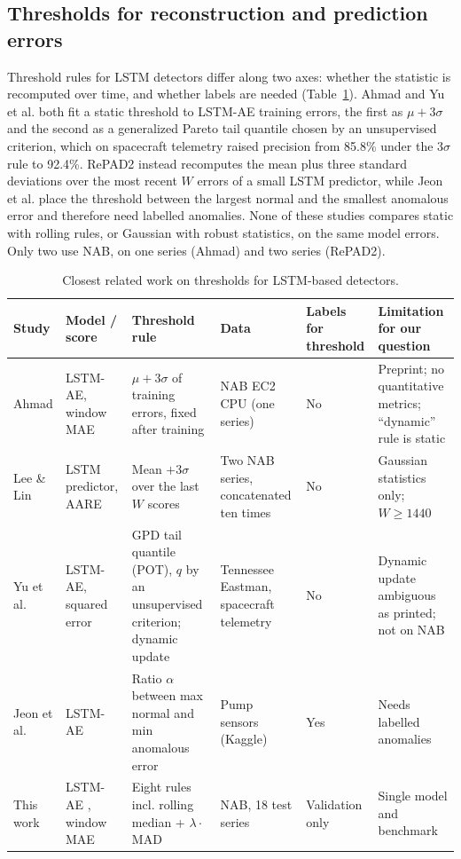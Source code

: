 \documentclass[conference]{IEEEtran}
\begin{document}
\subsection{Thresholds for reconstruction and prediction errors}
Threshold rules for LSTM detectors differ along two axes: whether the statistic is recomputed over time, and whether labels are needed (Table~\ref{tab:related}). Ahmad \cite{ahmad2026} and Yu et al. \cite{yu2024evt} both fit a static threshold to LSTM-AE training errors, the first as $\mu + 3\sigma$ and the second as a generalized Pareto tail quantile chosen by an unsupervised criterion, which on spacecraft telemetry raised precision from 85.8\% under the $3\sigma$ rule to 92.4\%. RePAD2 \cite{lee2023repad2} instead recomputes the mean plus three standard deviations over the most recent $W$ errors of a small LSTM predictor, while Jeon et al. \cite{jeon2023} place the threshold between the largest normal and the smallest anomalous error and therefore need labelled anomalies. None of these studies compares static with rolling rules, or Gaussian with robust statistics, on the same model errors. Only two use NAB, on one series (Ahmad) and two series (RePAD2).

\begin{table}[t]
\centering
\caption{Closest related work on thresholds for LSTM-based detectors.}
\label{tab:related}
\footnotesize
\setlength{\tabcolsep}{4pt}
\begin{tabular}{@{}>{\raggedright\arraybackslash}p{2.0cm}>{\raggedright\arraybackslash}p{2.5cm}>{\raggedright\arraybackslash}p{4.1cm}>{\raggedright\arraybackslash}p{2.9cm}>{\raggedright\arraybackslash}p{1.3cm}>{\raggedright\arraybackslash}p{3.6cm}@{}}
\toprule
Study & Model / score & Threshold rule & Data & Labels for threshold & Limitation for our question \\
\midrule
Ahmad \cite{ahmad2026} & LSTM-AE, window MAE & $\mu + 3\sigma$ of training errors, fixed after training & NAB EC2 CPU (one series) & No & Preprint; no quantitative metrics; ``dynamic'' rule is static \\
Lee \& Lin \cite{lee2023repad2} & LSTM predictor, AARE & Mean $+ 3\sigma$ over the last $W$ scores & Two NAB series, concatenated ten times & No & Gaussian statistics only; $W \geq 1440$ \\
Yu et al. \cite{yu2024evt} & LSTM-AE, squared error & GPD tail quantile (POT), $q$ by an unsupervised criterion; dynamic update & Tennessee Eastman, spacecraft telemetry & No & Dynamic update ambiguous as printed; not on NAB \\
Jeon et al. \cite{jeon2023} & LSTM-AE & Ratio $\alpha$ between max normal and min anomalous error & Pump sensors (Kaggle) & Yes & Needs labelled anomalies \\
This work & LSTM-AE \cite{ahmad2026}, window MAE & Eight rules incl. rolling median + $\lambda\cdot$MAD & NAB, 18 test series & Validation only & Single model and benchmark \\
\bottomrule
\end{tabular}
\end{table}
\end{document}
